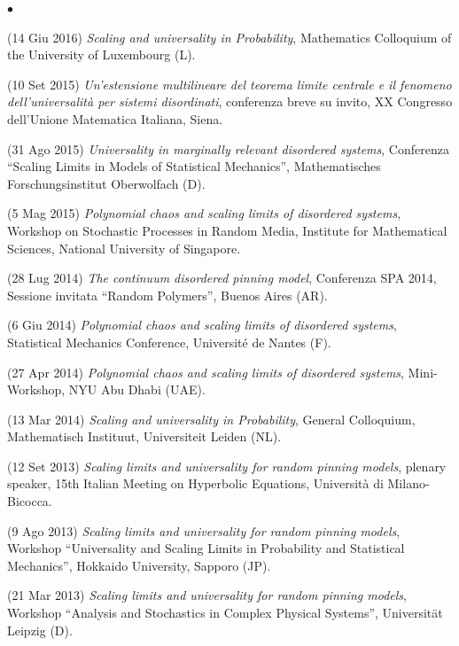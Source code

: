 \documentclass[a4paper,11pt,oneside]{amsart}
\newenvironment{myitemize}{%
\begin{list}{$\bullet$}%
 	{%
	\setlength{\itemsep}{0.3em}%
	\setlength{\topsep}{0.3em}%
	\setlength{\partopsep}{0em}%
	\setlength{\parsep}{0em}%
	\setlength{\parskip}{0em}%
	\setlength\leftmargin{1.5em}%
	\setlength\labelwidth{1.1em}%
	\setlength{\labelsep}{0.4em}%
	}%
	}%
{\end{list}}
\renewenvironment{itemize}{
\begin{myitemize}}%
{\end{myitemize}}
\begin{document}
\begin{itemize}
\item (14 Giu 2016)
\emph{Scaling and universality in Probability},
Mathematics Colloquium of the University of Luxembourg (L).

\item (10 Set 2015)
\emph{Un'estensione multilineare del teorema limite centrale
e il fenomeno dell'universalità per sistemi disordinati},
conferenza breve su invito,
XX Congresso dell'Unione Matematica Italiana, Siena.

\item (31 Ago 2015)
\emph{Universality in marginally relevant disordered systems},
Conferenza ``Scaling Limits in Models of Statistical Mechanics'',
Mathematisches Forschungsinstitut Oberwolfach (D).

\item (5 Mag 2015)
\emph{Polynomial chaos and scaling limits of disordered systems},
Workshop on Stochastic Processes in Random Media,  Institute for Mathematical Sciences,
National University of Singapore.

\item (28 Lug 2014)
\emph{The continuum disordered pinning model},
Conferenza SPA 2014, Sessione invitata ``Random Polymers'', Buenos Aires (AR).

\item (6 Giu 2014)
\emph{Polynomial chaos and scaling limits of disordered systems},
Statistical Mechanics Conference, Université de Nantes (F).

\item (27 Apr 2014)
\emph{Polynomial chaos and scaling limits of disordered systems},
Mini-Workshop, NYU Abu Dhabi (UAE).

\item (13 Mar 2014)
\emph{Scaling and universality in Probability},
General Colloquium, Mathematisch Instituut,
Universiteit Leiden (NL).

\item (12 Set 2013)
\emph{Scaling limits and universality for random pinning models},
plenary speaker, 15th Italian Meeting on Hyperbolic Equations,
Università di Milano-Bicocca.

\item (9 Ago 2013)
\emph{Scaling limits and universality for random pinning models},
Workshop ``Universality and Scaling Limits in Probability and Statistical Mechanics'',
Hokkaido University, Sapporo (JP).

\item (21 Mar 2013)
\emph{Scaling limits and universality for random pinning models},
Workshop ``Analysis and Stochastics in Complex Physical Systems'', Universit\"at Leipzig (D).


\end{itemize}
\end{document}
